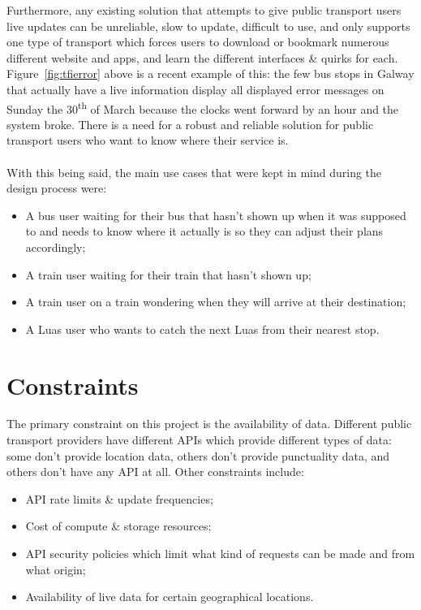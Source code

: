 \documentclass[a4paper,11pt]{report}
\begin{document}
Furthermore, any existing solution that attempts to give public transport users live updates can be unreliable, slow to update, difficult to use, and only supports one type of transport which forces users to download or bookmark numerous different website and apps, and learn the different interfaces \& quirks for each.
Figure~\ref{fig:tfierror} above is a recent example of this: the few bus stops in Galway that actually have a live information display all displayed error messages on Sunday the 30\textsuperscript{th} of March because the clocks went forward by an hour and the system broke.
There is a need for a robust and reliable solution for public transport users who want to know where their service is.
\\\\
With this being said, the main use cases that were kept in mind during the design process were:
\begin{itemize}
    \item   A bus user waiting for their bus that hasn't shown up when it was supposed to and needs to know where it actually is so they can adjust their plans accordingly;
    \item   A train user waiting for their train that hasn't shown up;
    \item   A train user on a train wondering when they will arrive at their destination;
    \item   A Luas user who wants to catch the next Luas from their nearest stop.
\end{itemize}

\section{Constraints}
The primary constraint on this project is the availability of data.
Different public transport providers have different APIs which provide different types of data:
some don't provide location data, others don't provide punctuality data, and others don't have any API at all.
Other constraints include:
\begin{itemize}
    \item   API rate limits \& update frequencies;
    \item   Cost of compute \& storage resources;
    \item   API security policies which limit what kind of requests can be made and from what origin;
    \item   Availability of live data for certain geographical locations.
\end{itemize}
\end{document}
